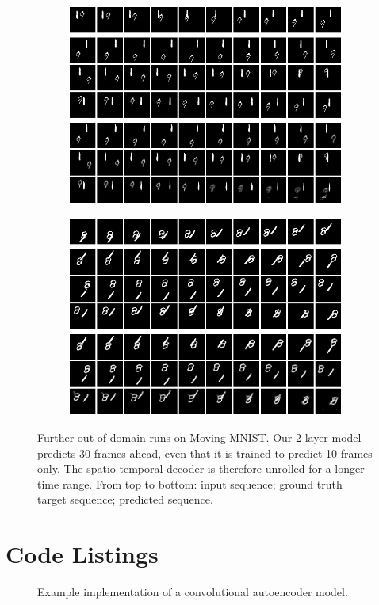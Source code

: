\begin{figure}[htpb]
\centering
\begin{subfigure}{0.5\textwidth}
  \centering
  \includegraphics[width=0.9\linewidth]{figures/pred/mm/long/prediction-00.png}
  \caption{}
  \label{fig:mm-pred-long1}
\end{subfigure}%
\begin{subfigure}{0.5\textwidth}
  \centering
  \includegraphics[width=0.9\linewidth]{figures/pred/mm/long/prediction-07.png}
  \caption{}
  \label{fig:mm-pred-long2}
\end{subfigure}
\caption[Long-Term Prediction on Moving MNIST]{Further out-of-domain runs on Moving MNIST. Our 2-layer model predicts 30 frames ahead, even that it is trained to predict 10 frames only. The spatio-temporal decoder is therefore unrolled for a longer time range. From top to bottom: input sequence; ground truth target sequence; predicted sequence.} \label{fig:mm-pred-long}
\end{figure}





\clearpage
\section{Code Listings}

\begin{figure}[h!tb]
  
  \caption[Code: Convolutional Autoencoder]{Example implementation of a convolutional autoencoder model.}\label{code:model}
\end{figure}

